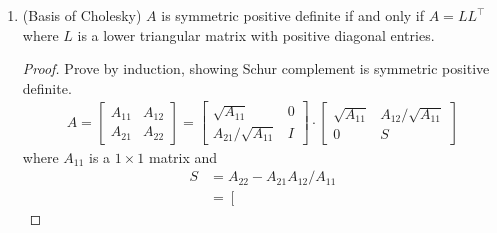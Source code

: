 \documentclass[11pt]{article}
\numberwithin{equation}{section}
\begin{document}
\begin{lemma}
\begin{enumerate}
\begin{proof}
            Let
            \begin{align*}
                e_{i}=\left[\begin{array}{l}
                    0 \\
                    \vdots \\
                    1 \\
                    \vdots \\
                    0
                    \end{array}\right],
            \end{align*}then $e_{i}^{\top} A e_{i}=A_{ii}$. Suppose $A_{ij}$, $i \neq j$ were largest. Let $x$ be a vector of zeros except for $x_i=1$ and $x_j=-\operatorname{sign}(A_{ij})$.
            Then \begin{align*}
                x^\top Ax = A_{ii} + A_{jj} - 2 |A_{ij}| \leq 0,
            \end{align*}
            a contradiction.
        \end{proof}
        \item (Basis of Cholesky) $A$ is symmetric positive definite if and only if $A=LL^\top$ where $L$ is a lower triangular matrix with positive diagonal entries. \begin{proof}
            Prove by induction, showing Schur complement is symmetric positive definite. \begin{align*}
                A = \left[\begin{array}{ll}
                    A_{11} & A_{12} \\
                    A_{21} & A_{22}
                    \end{array}\right] = \left[\begin{array}{ll}
                    \sqrt{A_{11}} & 0 \\
                    A_{21} / \sqrt{A_{11}} & I
                    \end{array}\right] \cdot \left[\begin{array}{cc}
                        \sqrt{A_{11}} & A_{12} / \sqrt{A_{11}} \\
                        0 & S
                        \end{array}\right]
            \end{align*}
            where $A_{11}$ is a $1 \times 1$ matrix and \begin{align*}
                S&=A_{22}-A_{21} A_{12} / A_{11} \\
                &= \left[\begin{array}{ll}

\end{array}
\end{align*}
\end{proof}
\end{enumerate}
\end{lemma}
\end{document}
